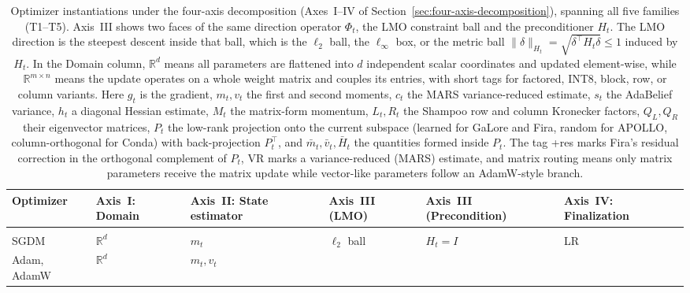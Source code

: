 \begin{table}[htbp]
  \centering
  \caption{Optimizer instantiations under the four-axis decomposition
  (Axes~I--IV of Section~\ref{sec:four-axis-decomposition}), spanning all five
  families (T1--T5). Axis~III shows two faces of the same direction operator
  $\Phi_t$, the LMO constraint ball and the preconditioner $H_t$. The LMO
  direction is the steepest descent inside that ball, which is the $\ell_2$ ball,
  the $\ell_\infty$ box, or the metric ball
  $\|\delta\|_{H_t}=\sqrt{\delta^\top H_t\delta}\le 1$ induced by $H_t$. In the Domain
  column, $\mathbb{R}^d$ means all parameters are flattened into $d$ independent
  scalar coordinates and updated element-wise, while
  $\mathbb{R}^{m\times n}$ means the update operates on a whole weight matrix
  and couples its entries, with short tags for factored, INT8, block, row, or
  column variants. Here $g_t$ is the gradient, $m_t,v_t$ the first and second moments,
  $c_t$ the MARS variance-reduced estimate, $s_t$ the AdaBelief variance, $h_t$ a
  diagonal Hessian estimate, $M_t$ the matrix-form momentum, $L_t,R_t$ the
  Shampoo row and column Kronecker factors, $Q_L,Q_R$ their eigenvector matrices,
  $P_t$ the low-rank projection onto the current subspace (learned for GaLore and
  Fira, random for APOLLO, column-orthogonal for Conda) with back-projection
  $P_t^\top$, and $\bar{m}_t,\bar{v}_t,\bar{H}_t$ the quantities formed inside
  $P_t$. The tag +res marks Fira's residual correction in the orthogonal
  complement of $P_t$, VR marks a variance-reduced (MARS) estimate, and matrix
  routing means only matrix parameters receive the matrix update while
  vector-like parameters follow an AdamW-style branch.}
  \label{tab:four-axis-instantiation}
  \scriptsize
  \setlength{\tabcolsep}{1.mm}
  \renewcommand{\arraystretch}{1.3}
  \begin{tabularx}{\textwidth}{
  @{}
  p{}
  p{}
  Y 
  Y 
  Y 
  Y
  @{}}
    \toprule
    Optimizer & Axis~I: Domain & Axis~II: State estimator
      & Axis~III (LMO) & Axis~III (Precondition) & Axis~IV: Finalization \\
    \midrule
     \\
    SGDM
      & $\mathbb{R}^d$ & $m_t$
      & $\ell_2$ ball & $H_t=I$ & LR \\
    Adam, AdamW
      & $\mathbb{R}^d$ & $m_t,v_t$

\end{tabularx}
\end{table}
